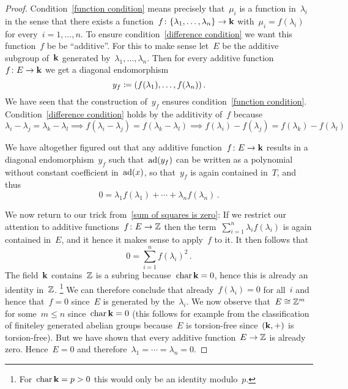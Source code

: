 \begin{proof}
  Condition~\eqref{function condition} means precisely that~$\mu_i$ is a function in~$\lambda_i$ in the sense that there exists a function~$f \colon \{\lambda_1, \dotsc, \lambda_n\} \to \mathbf{k}$ with~$\mu_i = f(\lambda_i)$ for every~$i = 1, \dotsc, n$.
  To ensure condition~\eqref{difference condition} we want this function~$f$ be be \enquote{additive}.
  For this to make sense let~$E$ be the additive subgroup of~$\mathbf{k}$ generated by~$\lambda_1, \dotsc, \lambda_n$.
  Then for every additive function~$f \colon E \to \mathbf{k}$ we get a diagonal endomorphism
  \[
    y_f
    \coloneqq
    (f(\lambda_1), \dotsc, f(\lambda_n))  \,.
  \]
  We have seen that the construction of~$y_f$ ensures condition~\eqref{function condition}.
  Condition~\eqref{difference condition} holds by the additivity of~$f$ because
  \[
    \lambda_i - \lambda_j
    =
    \lambda_k - \lambda_l
    \implies
    f(\lambda_i - \lambda_j)
    =
    f(\lambda_k - \lambda_l)
    \implies
    f(\lambda_i) - f(\lambda_j)
    =
    f(\lambda_k) - f(\lambda_l)
  \]
  
  We have altogether figured out that any additive function~$f \colon E \to \mathbf{k}$ results in a diagonal endomorphism~$y_f$ such that~$\operatorname{ad}(y_f)$ can be written as a polynomial without constant coefficient in~$\operatorname{ad}(x)$, so that~$y_f$ is again contained in~$T$, and thus
  \[
    0
    =
    \lambda_1 f(\lambda_1) + \dotsb + \lambda_n f(\lambda_n)  \,.
  \]
  
  We now return to our trick from~\eqref{sum of squares is zero}:
  If we restrict our attention to additive functions~$f \colon E \to \mathbb{Z}$ then the term~$\sum_{i=1}^n \lambda_i f(\lambda_i)$ is again contained in~$E$, and it hence it makes sense to apply~$f$ to it.
  It then follows that
  \[
    0
    =
    \sum_{i=1}^n f(\lambda_i)^2 \,.
  \]
  The field~$\mathbf{k}$ contains~$\mathbb{Z}$ is a subring because~$\operatorname{char} \mathbf{k} = 0$, hence this is already an identity in~$\mathbb{Z}$.%
  \footnote{For~$\operatorname{char} \mathbf{k} = p > 0$ this would only be an identity modulo~$p$.}
  We can therefore conclude that already~$f(\lambda_i) = 0$ for all~$i$ and hence that~$f = 0$ since~$E$ is generated by the~$\lambda_i$.
  We now observe that~$E \cong \mathbb{Z}^m$ for some~$m \leq n$ since~$\operatorname{char} \mathbf{k} = 0$ (this follows for example from the classification of finiteley generated abelian groups because~$E$ is torsion-free since~$(\mathbf{k},+)$ is torsion-free).
  But we have shown that every additive function~$E \to \mathbb{Z}$ is already zero.
  Hence~$E = 0$ and therefore~$\lambda_1 = \dotsb = \lambda_n = 0$.
\end{proof}


